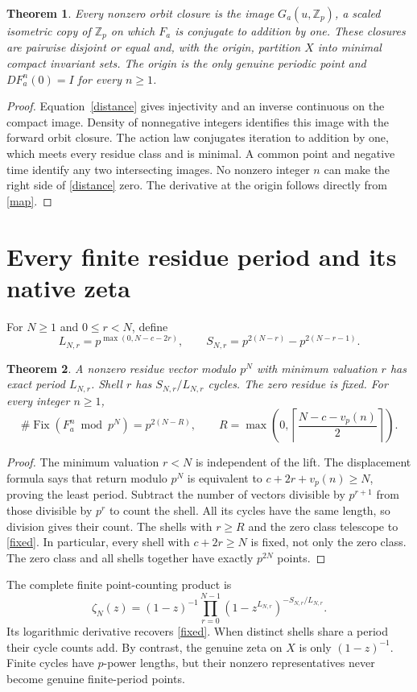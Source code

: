 \documentclass[10pt]{article}
\newtheorem{theorem}{Theorem}
\newcommand{\Zp}{\mathbb Z_p}
\newcommand{\Fix}{\operatorname{Fix}}
\begin{document}
\begin{theorem}\label{minimal}
Every nonzero orbit closure is the image $G_a(u,\Zp)$, a scaled isometric
copy of $\Zp$ on which $F_a$ is conjugate to addition by one. These
closures are pairwise disjoint or equal and, with the origin, partition
$X$ into minimal compact invariant sets. The origin is the only genuine
periodic point and $DF_a^n(0)=I$ for every $n\ge1$.
\end{theorem}
\begin{proof}
Equation~\eqref{distance} gives injectivity and an inverse continuous on
the compact image. Density of nonnegative integers identifies this image
with the forward orbit closure. The action law conjugates iteration to
addition by one, which meets every residue class and is minimal.
A common point and negative time identify any two intersecting images.
No nonzero integer $n$ can make the right side of \eqref{distance} zero.
The derivative at the origin follows directly from \eqref{map}.
\end{proof}

\section{Every finite residue period and its native zeta}
For $N\ge1$ and $0\le r<N$, define
\[
 L_{N,r}=p^{\max(0,N-c-2r)},\qquad
 S_{N,r}=p^{2(N-r)}-p^{2(N-r-1)}.
\]
\begin{theorem}\label{finite}
A nonzero residue vector modulo $p^N$ with minimum valuation $r$ has
exact period $L_{N,r}$. Shell $r$ has $S_{N,r}/L_{N,r}$ cycles.
The zero residue is fixed. For every integer $n\ge1$,
\begin{equation}\label{fixed}
 \#\Fix(F_a^n\bmod p^N)=p^{2(N-R)},\qquad
 R=\max\left(0,\left\lceil\frac{N-c-v_p(n)}2\right\rceil\right).
\end{equation}
\end{theorem}
\begin{proof}
The minimum valuation $r<N$ is independent of the lift. The displacement
formula says that return modulo $p^N$ is equivalent to
$c+2r+v_p(n)\ge N$, proving the least period. Subtract the number of
vectors divisible by $p^{r+1}$ from those divisible by $p^r$ to count the
shell. All its cycles have the same length, so division gives their count.
The shells with $r\ge R$ and the zero class telescope to \eqref{fixed}.
In particular, every shell with $c+2r\ge N$ is fixed, not only the zero
class. The zero class and all shells together have exactly $p^{2N}$ points.
\end{proof}
The complete finite point-counting product is
\begin{equation}\label{zeta}
 \zeta_N(z)=(1-z)^{-1}
 \prod_{r=0}^{N-1}(1-z^{L_{N,r}})^{-S_{N,r}/L_{N,r}}.
\end{equation}
Its logarithmic derivative recovers \eqref{fixed}. When distinct shells
share a period their cycle counts add. By contrast, the genuine zeta on
$X$ is only $(1-z)^{-1}$. Finite cycles have $p$-power lengths, but their
nonzero representatives never become genuine finite-period points.
\fi
\end{document}
